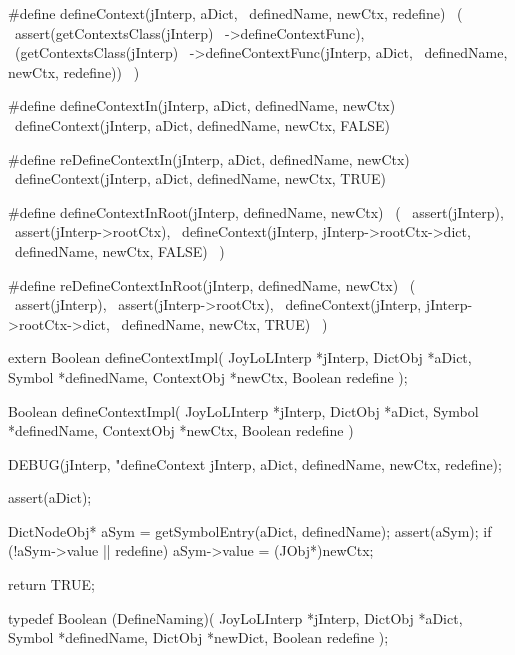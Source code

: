 #define defineContext(jInterp, aDict,     \
  definedName, newCtx, redefine)          \
  (                                       \
    assert(getContextsClass(jInterp)      \
      ->defineContextFunc),               \
    (getContextsClass(jInterp)            \
      ->defineContextFunc(jInterp, aDict, \
        definedName, newCtx, redefine))   \
  )

#define defineContextIn(jInterp, aDict, definedName, newCtx)  \
  defineContext(jInterp, aDict, definedName, newCtx, FALSE)

#define reDefineContextIn(jInterp, aDict, definedName, newCtx)  \
  defineContext(jInterp, aDict, definedName, newCtx, TRUE)

#define defineContextInRoot(jInterp, definedName, newCtx) \
  (                                                       \
    assert(jInterp),                                      \
    assert(jInterp->rootCtx),                             \
    defineContext(jInterp, jInterp->rootCtx->dict,        \
      definedName, newCtx, FALSE)                         \
  )

#define reDefineContextInRoot(jInterp, definedName, newCtx) \
  (                                                         \
    assert(jInterp),                                        \
    assert(jInterp->rootCtx),                               \
    defineContext(jInterp, jInterp->rootCtx->dict,          \
      definedName, newCtx, TRUE)                            \
  )
\stopCHeader

\setCHeaderStream{private}
\startCHeader
extern Boolean defineContextImpl(
  JoyLoLInterp *jInterp,
  DictObj      *aDict,
  Symbol       *definedName,
  ContextObj   *newCtx,
  Boolean       redefine
);
\stopCHeader
\setCHeaderStream{public}

\startCCode
Boolean defineContextImpl(
  JoyLoLInterp *jInterp,
  DictObj      *aDict,
  Symbol       *definedName,
  ContextObj   *newCtx,
  Boolean       redefine
) {
  DEBUG(jInterp, "defineContext %
        jInterp, aDict, definedName, newCtx, redefine);

  assert(aDict);
  
  DictNodeObj* aSym = getSymbolEntry(aDict, definedName);
  assert(aSym);
  if (!aSym->value || redefine) {
    aSym->value   = (JObj*)newCtx;
  }

  return TRUE;
}
\stopCCode

\startCHeader
typedef Boolean (DefineNaming)(
  JoyLoLInterp *jInterp,
  DictObj      *aDict,
  Symbol       *definedName,
  DictObj      *newDict,
  Boolean       redefine
);

